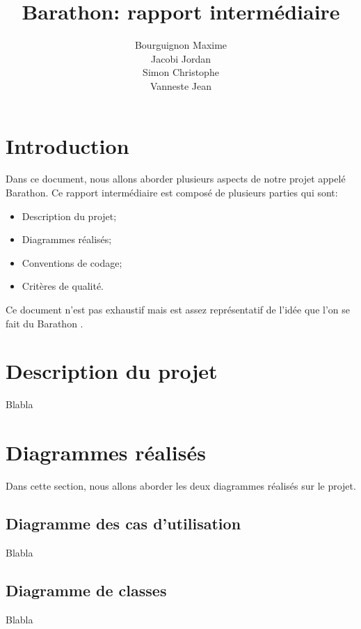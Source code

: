 \documentclass[a4paper,11pt]{article}
\title{Barathon: rapport intermédiaire}
\author{Bourguignon Maxime \\ Jacobi Jordan \\ Simon Christophe \\ Vanneste Jean}
\begin{document}
\maketitle


\section*{Introduction}
Dans ce document, nous allons aborder plusieurs aspects de notre projet appelé \og{} Barathon\fg{}. Ce rapport intermédiaire est composé de plusieurs parties qui sont:
\begin{itemize}
 \item Description du projet;
 \item Diagrammes réalisés;
 \item Conventions de codage;
 \item Critères de qualité.
\end{itemize}
Ce document n'est pas exhaustif mais est assez représentatif de l'idée que l'on se fait du \og{} Barathon \fg{}.

\section{Description du projet}
Blabla

\section{Diagrammes réalisés}
Dans cette section, nous allons aborder les deux diagrammes réalisés sur le projet.

\subsection{Diagramme des cas d'utilisation}
Blabla

\subsection{Diagramme de classes}
Blabla
\end{document}
